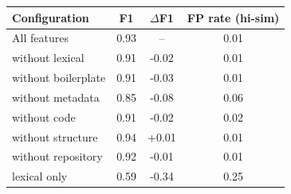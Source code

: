 \begin{tabular}{lccc}
\toprule
Configuration & F1 & $\Delta$F1 & FP rate (hi-sim) \\
\midrule
All features & 0.93 & -- & 0.01 \\
without lexical & 0.91 & -0.02 & 0.01 \\
without boilerplate & 0.91 & -0.03 & 0.01 \\
without metadata & 0.85 & -0.08 & 0.06 \\
without code & 0.91 & -0.02 & 0.02 \\
without structure & 0.94 & +0.01 & 0.01 \\
without repository & 0.92 & -0.01 & 0.01 \\
lexical only & 0.59 & -0.34 & 0.25 \\
\bottomrule
\end{tabular}
